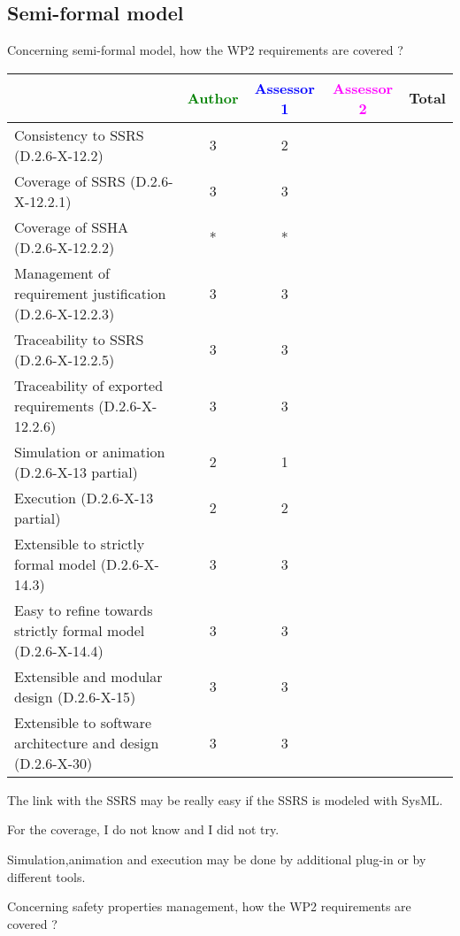 \subsection{Semi-formal model}

Concerning semi-formal model, how the WP2 requirements are covered ?

\begin{tabular}{|l | c | c | c | c|}
\hline
& \textcolor{green}{Author} & \textcolor{blue}{Assessor 1} & \textcolor{magenta}{Assessor 2} & Total \\
\hline 
Consistency to SSRS (D.2.6-X-12.2) &3 &2 & &  \\
\hline
Coverage of SSRS (D.2.6-X-12.2.1)  &3 & 3& &  \\
\hline
Coverage of SSHA (D.2.6-X-12.2.2)  & * & *& &  \\
\hline
Management of requirement justification (D.2.6-X-12.2.3)  &3 & 3& &  \\
\hline
Traceability to  SSRS (D.2.6-X-12.2.5)  & 3 & 3& &  \\
\hline
Traceability of exported requirements (D.2.6-X-12.2.6)  &3 & 3& &  \\
\hline
Simulation or animation (D.2.6-X-13 partial)  &2 & 1& &  \\
\hline
Execution (D.2.6-X-13 partial)  &2 & 2& &  \\
\hline
Extensible to strictly formal model (D.2.6-X-14.3) &3 & 3& &  \\
\hline
Easy to  refine towards strictly formal model (D.2.6-X-14.4) &3 & 3& &  \\
\hline
Extensible and modular design (D.2.6-X-15)  &3 & 3& &  \\
\hline
Extensible to software architecture and design (D.2.6-X-30)   &3 & 3& &  \\
\hline
\end{tabular}
\begin{author_comment}
The link with the SSRS may be really easy if the SSRS is modeled
with SysML.

For the coverage, I do not know and I did not try.


Simulation,animation  and execution may be done by additional plug-in
or by different tools.
\end{author_comment}
Concerning safety properties management, how the WP2 requirements are covered ?

